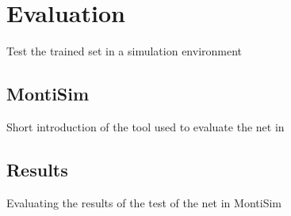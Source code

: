 \chapter{Evaluation}

Test the trained set in a simulation environment

\section{MontiSim}

Short introduction of the tool used to evaluate the net in \cite{MontiSim}

\section{Results}

Evaluating the results of the test of the net in MontiSim
